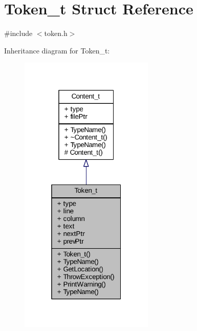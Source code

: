 \hypertarget{struct_token__t}{}\section{Token\+\_\+t Struct Reference}
\label{struct_token__t}


{\ttfamily \#include $<$token.\+h$>$}



Inheritance diagram for Token\+\_\+t\+:
\nopagebreak
\begin{figure}[H]
\begin{center}
\leavevmode
\includegraphics[width=181pt]{struct_token__t__inherit__graph}
\end{center}
\end{figure}


